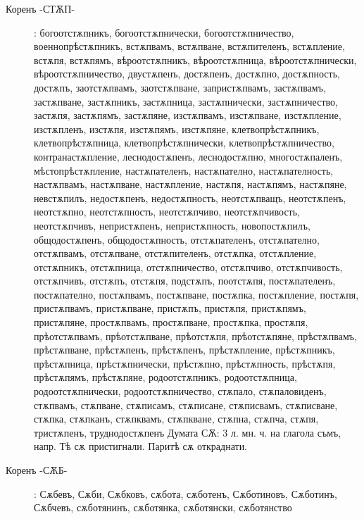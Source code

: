 \documentclass{article}
\begin{document}
\begin{description}
		\item[Коренъ -СТѪП-]: богоотстѫпникъ, богоотстѫпнически, богоотстѫпничество, военнопрѣстѫпникъ, встѫпвамъ, встѫпване, встѫпителенъ, встѫпление, встѫпя, встѫпямъ, вѣроотстѫпникъ, вѣроотстѫпница, вѣроотстѫпнически, вѣроотстѫпничество, двустѫпенъ, достѫпенъ, достѫпно, достѫпность, достѫпъ, заотстѫпвамъ, заотстѫпване, запристѫпвамъ, застѫпвамъ, застѫпване, застѫпникъ, застѫпница, застѫпнически, застѫпничество, застѫпя, застѫпямъ, застѫпяне, изстѫпвамъ, изстѫпване, изстѫпление, изстѫпленъ, изстѫпя, изстѫпямъ, изстѫпяне, клетвопрѣстѫпникъ, клетвопрѣстѫпница, клетвопрѣстѫпнически, клетвопрѣстѫпничество, контранастѫпление, леснодостѫпенъ, леснодостѫпно, многостѫпаленъ, мѣстопрѣстѫпление, настѫпателенъ, настѫпателно, настѫпателность, настѫпвамъ, настѫпване, настѫпление, настѫпя, настѫпямъ, настѫпяне, невстѫпилъ, недостѫпенъ, недостѫпность, неотстѫпващъ, неотстѫпенъ, неотстѫпно, неотстѫпность, неотстѫпчиво, неотстѫпчивость, неотстѫпчивъ, непристѫпенъ, непристѫпность, новопостѫпилъ, общодостѫпенъ, общодостѫпность, отстѫпателенъ, отстѫпателно, отстѫпвамъ, отстѫпване, отстѫпителенъ, отстѫпка, отстѫпление, отстѫпникъ, отстѫпница, отстѫпничество, отстѫпчиво, отстѫпчивость, отстѫпчивъ, отстѫпъ, отстѫпя, подстѫпъ, поотстѫпя, постѫпателенъ, постѫпателно, постѫпвамъ, постѫпване, постѫпка, постѫпление, постѫпя, пристѫпвамъ, пристѫпване, пристѫпъ, пристѫпя, пристѫпямъ, пристѫпяне, простѫпвамъ, простѫпване, простѫпка, простѫпя, прѣотстѫпвамъ, прѣотстѫпване, прѣотстѫпя, прѣотстѫпяне, прѣстѫпвамъ, прѣстѫпване, прѣстѫпенъ, прѣстѫпенъ, прѣстѫпление, прѣстѫпникъ, прѣстѫпница, прѣстѫпнически, прѣстѫпно, прѣстѫпность, прѣстѫпя, прѣстѫпямъ, прѣстѫпяне, родоотстѫпникъ, родоотстѫпница, родоотстѫпнически, родоотстѫпничество, стѫпало, стѫпаловиденъ, стѫпвамъ, стѫпване, стѫписамъ, стѫписане, стѫписвамъ, стѫписване, стѫпка, стѫпканъ, стѫпквамъ, стѫпкване, стѫпна, стѫпча, стѫпя, тристѫпенъ, труднодостѫпенъ
		Думата СѪ: 3 л. мн. ч. на глагола съмъ, напр. Тѣ сѫ пристигнали. Паритѣ сѫ откраднати.
		
		\item[Коренъ -СѪБ-]: Сѫбевъ, Сѫби, Сѫбковъ, сѫбота, сѫботенъ, Сѫботиновъ, Сѫботинъ, Сѫбчевъ, сѫботянинъ, сѫботянка, сѫботянски, сѫботянство
		

\end{description}
\end{document}
